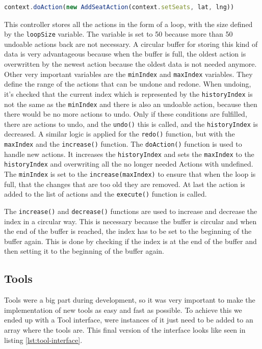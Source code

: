 \begin{lstlisting}[language=TypeScript,caption={Registering a new action in the controller},label={lst:register-action}]
context.doAction(new AddSeatAction(context.setSeats, lat, lng))
\end{lstlisting}

This controller stores all the actions in the form of a loop, with the size defined by the \texttt{loopSize} variable. The variable is set to 50 because more than 50 undoable actions back are not necessary. A circular buffer for storing this kind of data is very advantageous because when the buffer is full, the oldest action is overwritten by the newest action because the oldest data is not needed anymore. Other very important variables are the \texttt{minIndex} and \texttt{maxIndex} variables. They define the range of the actions that can be undone and redone. When undoing, it's checked that the current index which is represented by the \texttt{historyIndex} is not the same as the \texttt{minIndex} and there is also an undoable action, because then there would be no more actions to undo. Only if these conditions are fulfilled, there are actions to undo, and the \texttt{undo()} this is called, and the \texttt{historyIndex} is decreased. A similar logic is applied for the \texttt{redo()} function, but with the \texttt{maxIndex} and the \texttt{increase()} function. The \texttt{doAction()} function is used to handle new actions. It increases the \texttt{historyIndex} and sets the \texttt{maxIndex} to the \texttt{historyIndex} and overwriting all the no longer needed Actions with undefined. The \texttt{minIndex} is set to the \texttt{increase(maxIndex)} to ensure that when the loop is full, that the changes that are too old they are removed. At last the action is added to the list of actions and the \texttt{execute()} function is called.

The \texttt{increase()} and \texttt{decrease()} functions are used to increase and decrease the index in a circular way. This is necessary because the buffer is circular and when the end of the buffer is reached, the index has to be set to the beginning of the buffer again. This is done by checking if the index is at the end of the buffer and then setting it to the beginning of the buffer again.

\subsection{Tools}
Tools were a big part during development, so it was very important to make the implementation of new tools as easy and fast as possible. To achieve this we ended up with a Tool interface, were instances of it just need to be added to an array where the tools are. This final version of the interface looks like seen in listing \ref{lst:tool-interface}.


